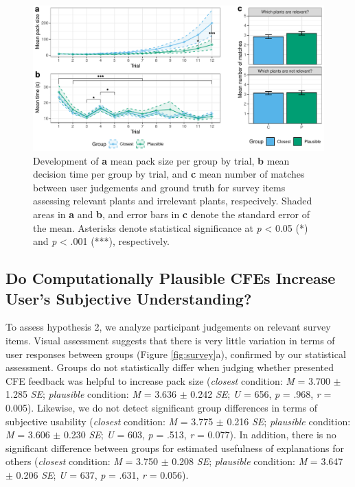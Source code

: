 \begin{figure}
   \centering
   \includegraphics[width=\textwidth]{./media/H1_p_ShubsPerTrial_RTPertrial_PAZ_FINAL.pdf}
   \caption{Development of \textbf{a} mean pack size per group by trial, \textbf{b} mean decision time per group by trial, and \textbf{c} mean number of matches between user judgements and ground truth for survey items assessing relevant plants and irrelevant plants, respecively. Shaded areas in \textbf{a} and \textbf{b}, and error bars in \textbf{c} denote the standard error of the mean. Asterisks denote statistical significance at \textit{p} < 0.05 (*) and \textit{p} < .001 (***), respectively.}
   \label{fig:hyp1}
 \end{figure}

\subsection{Do Computationally Plausible CFEs Increase User's Subjective Understanding?}
To assess hypothesis 2, we analyze participant judgements on relevant survey items.
Visual assessment suggests that there is very little variation in terms of user responses between groups (Figure \ref{fig:survey}a), confirmed by our statistical assessment. 
Groups do not statistically differ when judging whether presented \gls{CFE} feedback was helpful to increase pack size (\textit{closest} condition: \textit{M} = 3.700 $\pm$ 1.285 \textit{SE}; \textit{plausible} condition: \textit{M} = 3.636 $\pm$ 0.242 \textit{SE}; \textit{U} = 656, \textit{p} = .968, \textit{r} = 0.005).
Likewise, we do not detect significant group differences in terms of subjective usability (\textit{closest} condition: \textit{M} = 3.775 $\pm$ 0.216 \textit{SE}; \textit{plausible} condition: \textit{M} = 3.606 $\pm$ 0.230 \textit{SE}; \textit{U} = 603, \textit{p} = .513, \textit{r} = 0.077).
In addition, there is no significant difference between groups for estimated usefulness of explanations for others (\textit{closest} condition: \textit{M} = 3.750 $\pm$ 0.208 \textit{SE}; \textit{plausible} condition: \textit{M} = 3.647 $\pm$ 0.206 \textit{SE}; \textit{U} = 637, \textit{p} = .631, \textit{r} = 0.056).

